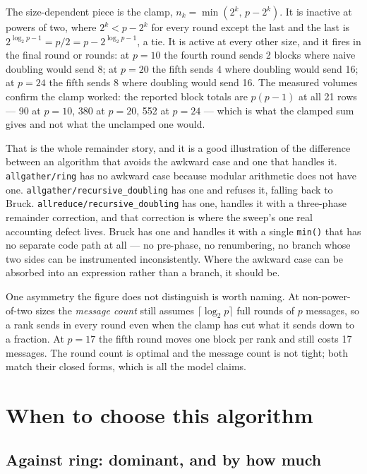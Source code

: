 \documentclass[11pt]{article}
\begin{document}
The size-dependent piece is the clamp, $n_k = \min(2^k,\, p - 2^k)$. It is inactive at powers of
two, where $2^k < p - 2^k$ for every round except the last and the last is $2^{\log_2 p - 1} =
p/2 = p - 2^{\log_2 p - 1}$, a tie. It is active at every other size, and it fires in the final
round or rounds: at $p=10$ the fourth round sends 2 blocks where naive doubling would send 8; at
$p=20$ the fifth sends 4 where doubling would send 16; at $p=24$ the fifth sends 8 where doubling
would send 16. The measured volumes confirm the clamp worked: the reported block totals are
$p(p-1)$ at all 21 rows --- 90 at $p=10$, 380 at $p=20$, 552 at $p=24$ --- which is what the
clamped sum gives and not what the unclamped one would.

That is the whole remainder story, and it is a good illustration of the difference between an
algorithm that avoids the awkward case and one that handles it. \texttt{allgather/ring} has no
awkward case because modular arithmetic does not have one.
\texttt{allgather/recursive\_doubling} has one and refuses it, falling back to Bruck.
\texttt{allreduce/recursive\_doubling} has one, handles it with a three-phase remainder
correction, and that correction is where the sweep's one real accounting defect lives. Bruck has
one and handles it with a single \texttt{min()} that has no separate code path at all --- no
pre-phase, no renumbering, no branch whose two sides can be instrumented inconsistently. Where
the awkward case can be absorbed into an expression rather than a branch, it should be.

One asymmetry the figure does not distinguish is worth naming. At non-power-of-two sizes the
\emph{message count} still assumes $\lceil\log_2 p\rceil$ full rounds of $p$ messages, so a rank
sends in every round even when the clamp has cut what it sends down to a fraction. At $p=17$ the
fifth round moves one block per rank and still costs 17 messages. The round count is optimal and
the message count is not tight; both match their closed forms, which is all the model claims.

\section{When to choose this algorithm}

\subsection{Against ring: dominant, and by how much}
\end{document}
